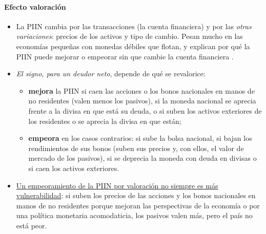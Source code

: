 \documentclass[11pt]{article}
\begin{document}
\paragraph{Efecto valoración}
\begin{itemize}
\item La PIIN cambia por las transacciones (la cuenta financiera) y por las \emph{otras variaciones}: precios de los activos y tipo de cambio. Pesan mucho en las economías pequeñas con monedas débiles que flotan, y explican por qué la PIIN puede mejorar o empeorar sin que cambie la cuenta financiera \parencite{LaneMilesiFerretti2007}.
\item \emph{El signo, para un deudor neto}, depende de qué se revalorice:
  \begin{itemize}
  \item \textbf{mejora} la PIIN si caen las acciones o los bonos nacionales en manos de no residentes (valen menos los pasivos), si la moneda nacional se aprecia frente a la divisa en que está su deuda, o si suben los activos exteriores de los residentes o se aprecia la divisa en que están;
  \item \textbf{empeora} en los casos contrarios: si sube la bolsa nacional, si bajan los rendimientos de sus bonos (suben sus precios y, con ellos, el valor de mercado de los pasivos), si se deprecia la moneda con deuda en divisas o si caen los activos exteriores.
  \end{itemize}
\item \uline{Un empeoramiento de la PIIN por valoración no siempre es más vulnerabilidad}: si suben los precios de las acciones y los bonos nacionales en manos de no residentes porque mejoran las perspectivas de la economía o por una política monetaria acomodaticia, los pasivos valen más, pero el país no está peor.
\end{itemize}
\end{document}
